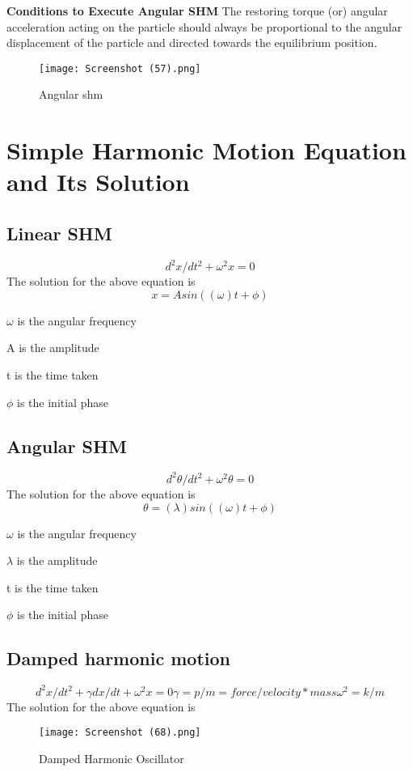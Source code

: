 \documentclass{article}
\begin{document}
\textbf{Conditions to Execute Angular SHM}
The restoring torque (or) angular acceleration acting on the particle should always be proportional to the angular displacement of the particle and directed towards the equilibrium position.
\begin{figure}[h]
    \centering
    \texttt{[image: Screenshot (57).png]}
    \caption{Angular shm}
    \label{fig:enter-label}
\end{figure}
\section{Simple Harmonic Motion Equation and Its Solution}
\subsection{Linear SHM}
\begin{equation}
d^2x/dt^2 + \omega^2x = 0
\end{equation}
The solution for the above equation is
\begin{equation}
    x=Asin((\omega)t+\phi)
\end{equation}
   
    $\omega$ is the angular frequency

    A is the amplitude
    
    t is the time taken

    
    $\phi$ is the initial phase
\subsection{Angular SHM}
\begin{equation}
    d^2\theta/dt^2 + \omega^2\theta = 0
\end{equation}
The solution for the above equation is
\begin{equation}
     \theta=(\lambda)sin((\omega)t+\phi)
\end{equation}

    $\omega$ is the angular frequency

    $\lambda$ is the amplitude
    
    t is the time taken

    
    $\phi$ is the initial phase
\subsection{Damped harmonic motion}
\begin{equation}
    d^2x/dt^2 + \gamma dx/dt +\omega^2x=0

    
    \gamma=p/m=force/velocity*mass

    
    \omega^2=k/m
\end{equation}
The solution for the above equation is 
\begin{figure}[h]
    \centering
    \texttt{[image: Screenshot (68).png]}
    \caption{Damped Harmonic Oscillator}
    \label{fig:enter-label}
\end{figure}


\end{document}
